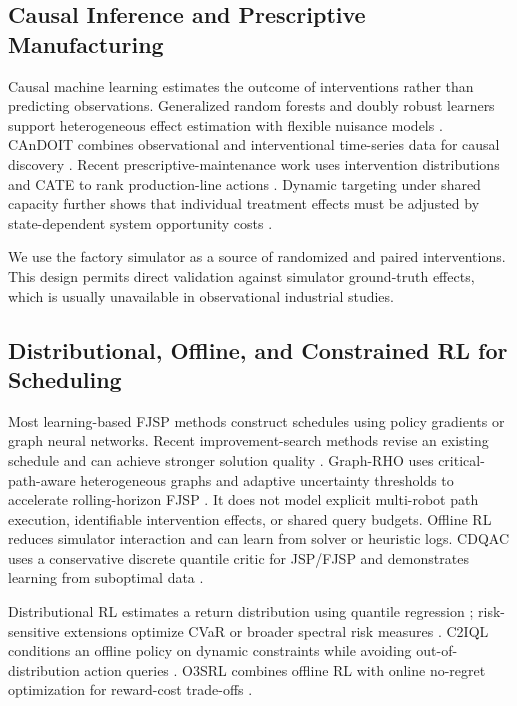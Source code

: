 \documentclass[11pt,a4paper]{article}
\begin{document}
\subsection{Causal Inference and Prescriptive Manufacturing}

Causal machine learning estimates the outcome of interventions rather than
predicting observations. Generalized random forests and doubly robust learners
support heterogeneous effect estimation with flexible nuisance models
\citep{athey2019,chernozhukov2018}. CAnDOIT combines observational and
interventional time-series data for causal discovery \citep{castri2024}.
Recent prescriptive-maintenance work uses intervention distributions and CATE
to rank production-line actions \citep{saretzky2026}. Dynamic targeting under
shared capacity further shows that individual treatment effects must be
adjusted by state-dependent system opportunity costs \citep{hu2025}.

We use the factory simulator as a source of randomized and paired interventions.
This design permits direct validation against simulator ground-truth effects,
which is usually unavailable in observational industrial studies.

\subsection{Distributional, Offline, and Constrained RL for Scheduling}

Most learning-based FJSP methods construct schedules using policy gradients or
graph neural networks. Recent improvement-search methods revise an existing
schedule and can achieve stronger solution quality \citep{wang2025}. Graph-RHO
uses critical-path-aware heterogeneous graphs and adaptive uncertainty
thresholds to accelerate rolling-horizon FJSP \citep{li2026graphrho}. It does not
model explicit multi-robot path execution, identifiable intervention effects,
or shared query budgets. Offline RL reduces simulator interaction and can learn
from solver or heuristic logs. CDQAC uses a conservative discrete quantile
critic for JSP/FJSP and demonstrates learning from suboptimal data
\citep{remmerden2025}.

Distributional RL estimates a return distribution using quantile regression
\citep{dabney2018}; risk-sensitive extensions optimize CVaR or broader spectral
risk measures \citep{moghimi2025}. C2IQL conditions an offline policy on dynamic
constraints while avoiding out-of-distribution action queries
\citep{liu2025c2iql}. O3SRL combines offline RL with online no-regret
optimization for reward-cost trade-offs \citep{chemingui2025}.
\end{document}
